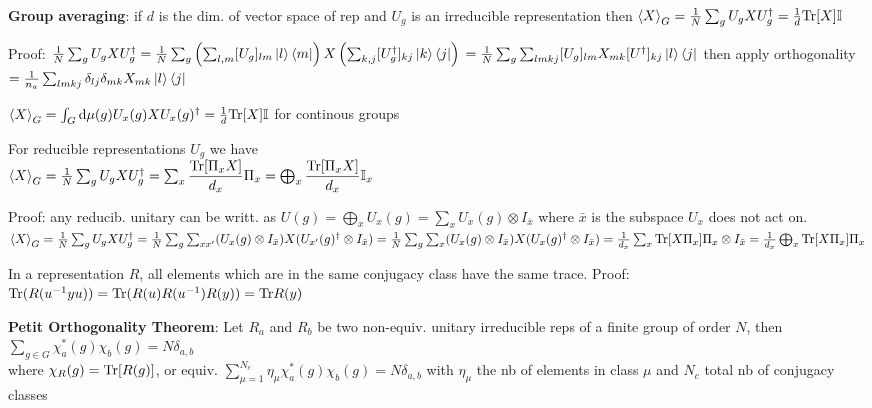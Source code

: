 \begin{squishlist}
    \item \textbf{Group averaging}: if $d$ is the dim. of vector space of rep and $U_g$ is an irreducible representation then $\braket{X}_G = \frac{1}{N} \sum_g U_g X U_g^{\dagger} = \frac{1}{d} \mathrm{Tr}[X] \mathbb{I}$  
    \item Proof: $\frac{1}{N} \sum_g U_g X U_g^{\dagger} = \frac{1}{N} \sum_g \left( \sum_{l,m}[U_g]_{lm} \ket{l}\bra{m}\right) X \left( \sum_{k,j} [U_g^{\dagger}]_{kj}\ket{k}\bra{j}\right) \\ 
    = \frac{1}{N} \sum_g \sum_{lmkj} [U_g]_{lm} X_{mk} [U^{\dagger}]_{kj} \ket{l}\bra{j}$ then apply orthogonality \\
    $= \frac{1}{n_a} \sum_{lmkj} \delta_{lj} \delta_{mk} X_{mk} \ket{l}\bra{j} $

    \item $\braket{X}_G = \int_G \textrm{d} \mu(g) U_x(g) X U_x(g)^{\dagger} = \frac{1}{d} \mathrm{Tr}[X] \mathbb{I}$ for continous groups
    \item For reducible representations $U_g$ we have \\
    $\braket{X}_G = \frac{1}{N} \sum_g U_g X U_g^{\dagger} = \sum_x \dfrac{\mathrm{Tr}[\Pi_x X]}{d_x} \Pi_x = \bigoplus_x \dfrac{\mathrm{Tr}[\Pi_x X]}{d_x} \mathbb{I}_x$
    \item Proof: any reducib. unitary can be writt. as $U(g) = \bigoplus_x U_x(g) = \sum_x U_x(g) \otimes I_{\bar{x}}$ where $\bar{x}$ is the subspace $U_x$ does not act on. \\ $\braket{X}_G = \frac{1}{N} \sum_g U_g X U_g^{\dagger} = \frac{1}{N} \sum_g \sum_{xx'}(U_x(g) \otimes I_{\bar{x}}) X (U_{x'}(g)^{\dagger} \otimes I_{\bar{x}}) = 
    \frac{1}{N} \sum_g \sum_{x}(U_x(g) \otimes I_{\bar{x}}) X (U_{x}(g)^{\dagger} \otimes I_{\bar{x}}) = 
    \frac{1}{d_x} \sum_x \mathrm{Tr} [ X \Pi_x] \Pi_x \otimes I_{\bar{x}} =
    \frac{1}{d_x} \bigoplus_x \mathrm{Tr} [ X \Pi_x] \Pi_x$

    \columnbreak

    \item In a representation $R$, all elements which are in the same conjugacy class have the same trace. Proof: $\mathrm{Tr}(R(u^{-1}y u)) = \mathrm{Tr}(R(u)R(u^{-1})R(y)) = \mathrm{Tr} R(y)$
    \item \textbf{Petit Orthogonality Theorem}: Let $R_a$ and $R_b$ be two non-equiv. unitary irreducible reps of a finite group of order $N$, then $\sum_{g \in G} \chi^*_a(g) \chi_b(g) = N \delta_{a,b}$ \\ 
    where $\chi_R(g) = \mathrm{Tr}[R(g)]$, or equiv. $\sum_{\mu =1}^{N_c} \eta_{\mu}\chi^*_a(g) \chi_b(g) = N \delta_{a,b}$ with $\eta_{\mu}$ the nb of elements in class $\mu$ and $N_c$ total nb of conjugacy classes


\end{squishlist}
